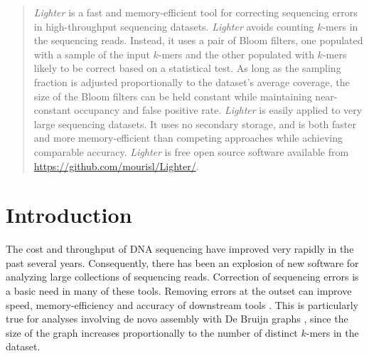 \documentclass[10pt]{article}
\begin{document}
\begin{abstract}
\emph{Lighter} is a fast and memory-efficient tool for correcting sequencing errors in high-throughput sequencing datasets.
\emph{Lighter} avoids counting $k$-mers in the sequencing reads.
Instead, it uses a pair of Bloom filters, one populated with a sample of the input $k$-mers and the other populated with $k$-mers likely to be correct based on a statistical test.
As long as the sampling fraction is adjusted proportionally to the dataset's average coverage, the size of the Bloom filters can be held constant while maintaining near-constant occupancy and false positive rate.
\emph{Lighter} is easily applied to very large sequencing datasets.  It uses no secondary storage, and is both faster and more memory-efficient than competing approaches while achieving comparable accuracy.
\emph{Lighter} is free open source software available from \url{https://github.com/mourisl/Lighter/}.
\end{abstract}



\section*{Introduction}
The cost and throughput of DNA sequencing have improved very rapidly in the past several years.
Consequently, there has been an explosion of new software for analyzing large collections of sequencing reads.
Correction of sequencing errors is a basic need in many of these tools.
Removing errors at the outset can improve speed, memory-efficiency and accuracy of downstream tools \cite{}.
This is particularly true for analyses involving de novo assembly with De Bruijn graphs \cite{}, since the size of the graph increases proportionally to the number of distinct $k$-mers in the dataset.
\end{document}
